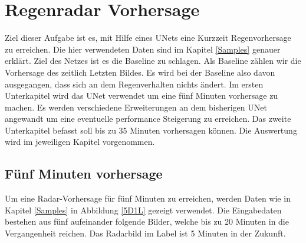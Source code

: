 \section{Regenradar Vorhersage}
Ziel dieser Aufgabe ist es, mit Hilfe eines UNets eine Kurzzeit Regenvorhersage zu erreichen. Die hier verwendeten Daten sind im Kapitel \ref{Samples} genauer erklärt. Ziel des Netzes ist es die Baseline zu schlagen. Als Baseline zählen wir die Vorhersage des zeitlich Letzten Bildes. Es wird bei der Baseline also davon ausgegangen, dass sich an dem Regenverhalten nichts ändert. Im ersten Unterkapitel wird das UNet verwendet um eine fünf Minuten vorhersage zu machen. Es werden verschiedene Erweiterungen an dem bisherigen UNet angewandt um eine eventuelle performance Steigerung zu erreichen. Das zweite Unterkapitel befasst soll bis zu 35 Minuten vorhersagen können. Die Auswertung wird im jeweiligen Kapitel vorgenommen.

\subsection{Fünf Minuten vorhersage}
Um eine Radar-Vorhersage für fünf Minuten zu erreichen, werden Daten wie in Kapitel \ref{Samples} in Abbildung \ref{5D1L} gezeigt verwendet. Die Eingabedaten bestehen aus fünf aufeinander folgende Bilder, welche bis zu 20 Minuten in die Vergangenheit reichen. Das Radarbild im Label ist 5 Minuten in der Zukunft.

